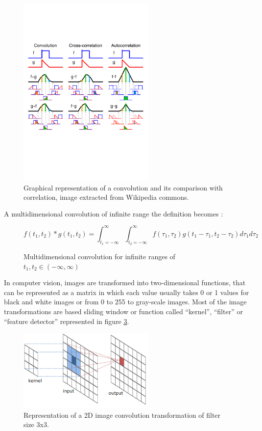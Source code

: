 \begin{figure}[!htp]
  \center
  \includegraphics[width=0.6\textwidth]{figures/comparison_convolution_correlation}
  \caption{Graphical representation of a convolution and its comparison with correlation, image extracted from Wikipedia commons.}
  \label{fig:representation_convolution}
\end{figure}

A multidimensional convolution of infinite range the definition becomes \cite{multidimensionalConvolution}: 

\begin{figure}[!htp]
  \center
  \[f(t_1,t_2) \ast g(t_1,t_2) = \int_{t_1=-\infty}^{\infty}\int_{t_2=-\infty}^{\infty} f(\tau _1,\tau _2)g(t_1-\tau _1,t_2-\tau _2)d\tau _1 d\tau _2\]
  \caption{Multidimensional convolution for infinite ranges of $t_1,t_2 \in (-\infty, \infty)$}
  \label{fig:multidimension_convolution_infinite_range}
\end{figure}

In computer vision, images are transformed into two-dimensional functions, that can be represented as a matrix in which each value usually takes 0 or 1 values for black and white images or from 0 to 255 to gray-scale images. Most of the image transformations are based sliding window or function called ``kernel'', ``filter'' or ``feature detector'' \cite{cnnDennyBritz} represented in figure \ref{fig:convolution_filter}.

\begin{figure}[!htp]
  \center
  \includegraphics[width=0.6\textwidth]{figures/convolution_filter}
  \caption{Representation of a 2D image convolution transformation of filter size 3x3.}
  \label{fig:convolution_filter}
\end{figure}

